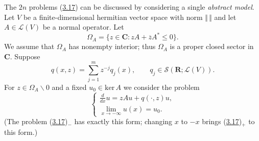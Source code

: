 \documentclass{surv-l}
\theoremstyle{plain}
\theoremstyle{definition}
\numberwithin{equation}{chapter}
\begin{document}
The $2n$ problems (\hyperref[eq3.17-]{3.17}) can be discussed by considering a single \emph{abstract model}. Let $V$ be a finite-dimensional hermitian vector space with norm $\Vert\,\Vert$ and let $A\in \mathscr{L}(V)$ be a normal operator. Let
\begin{equation}\label{eq3.19}
\Omega_{A}=\{z\in \mathbf{C}:zA+\overline{z}A^{*}\leq 0\}.
\end{equation}
We assume that $\Omega_{A}$ has nonempty interior; thus $\Omega_{A}$ is a proper closed sector in $\mathbf{C}$. Suppose
\begin{equation}\label{eq3.20}
q(x, z)=\sum_{j=1}^{m}z^{-j}q_{j}(x), \qquad q_{j}\in \mathscr{S}(\mathbf{R};\mathscr{L}(V)).
\end{equation}
For $z\in\Omega_{A}\backslash 0$ and a fixed $u_{0}\in \mathrm{ker}\,A$ we consider the problem
\begin{equation}\label{eq3.21}
\left\{\begin{array}{l}
\frac{d}{dx}u=zAu+q(\cdot, z)u,\\
\lim_{x\rightarrow-\infty}u(x)=u_{0}.
\end{array}\right.
\end{equation}
(The problem (\hyperref[eq3.17-]{3.17})$_{-}$ has exactly this form; changing $x$ to $-x$ brings (\hyperref[eq3.17-]{3.17})$_{+}$ to this form.)
\end{document}
